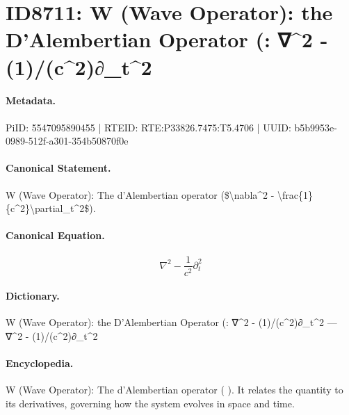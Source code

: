 \section*{ID8711: W (Wave Operator): the D’Alembertian Operator (: ∇\textasciicircum{}2 - (1)/(c\textasciicircum{}2)∂\_t\textasciicircum{}2}
\paragraph{Metadata.}
PiID: 5547095890455 | RTEID: RTE:P33826.7475:T5.4706 | UUID: b5b9953e-0989-512f-a301-354b50870f0e

\paragraph{Canonical Statement.}
W (Wave Operator): The d’Alembertian operator (\$\textbackslash{}nabla\textasciicircum{}2 - \textbackslash{}frac\{1\}\{c\textasciicircum{}2\}\textbackslash{}partial\_t\textasciicircum{}2\$).

\paragraph{Canonical Equation.}
\[
\nabla^2 - \frac{1}{c^2}\partial_t^2
\]

\paragraph{Dictionary.}
W (Wave Operator): the D’Alembertian Operator (: ∇\textasciicircum{}2 - (1)/(c\textasciicircum{}2)∂\_t\textasciicircum{}2 — ∇\textasciicircum{}2 - (1)/(c\textasciicircum{}2)∂\_t\textasciicircum{}2

\paragraph{Encyclopedia.}
W (Wave Operator): The d’Alembertian operator ( ). It relates the quantity to its derivatives, governing how the system evolves in space and time.
